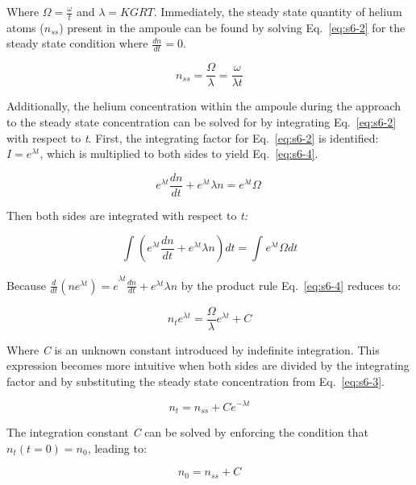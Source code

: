 Where \(\Omega = \frac{\omega}{t}\) and \(\lambda = KGRT\). Immediately,
the steady state quantity of helium atoms (\(n_{ss}\)) present in the
ampoule can be found by solving Eq.~\eqref{eq:s6-2} for the steady state condition
where \(\frac{dn}{dt} = 0\).

\begin{equation}
n_{ss} = \frac{\Omega}{\lambda} = \frac{\omega}{\lambda t}
\label{eq:s6-3}
\end{equation}

Additionally, the helium concentration within the ampoule during the
approach to the steady state concentration can be solved for by
integrating Eq.~\eqref{eq:s6-2} with respect to \emph{t}. First, the integrating
factor for Eq.~\eqref{eq:s6-2} is identified: \(I = e^{\lambda t}\), which is
multiplied to both sides to yield Eq.~\eqref{eq:s6-4}.

\begin{equation}
e^{\lambda t}\frac{dn}{dt} + e^{\lambda t}\lambda n = e^{\lambda t}\Omega\
\label{eq:s6-4}
\end{equation}

Then both sides are integrated with respect to \emph{t:}

\[\int_{}^{}\left( e^{\lambda t}\frac{dn}{dt} + e^{\lambda t}\lambda n \right)dt = \int_{}^{}{e^{\lambda t}\Omega}dt\]

Because
\({\frac{d}{dt}(ne^{\lambda t}) = e}^{\lambda t}\frac{dn}{dt} + e^{\lambda t}\lambda n\)
by the product rule Eq.~\eqref{eq:s6-4} reduces to:

\begin{equation}
n_{t}e^{\lambda t} = \frac{\Omega}{\lambda}e^{\lambda t} + C
\label{eq:s6-5}
\end{equation}

Where \emph{C} is an unknown constant introduced by indefinite
integration. This expression becomes more intuitive when both sides are
divided by the integrating factor and by substituting the steady state
concentration from Eq.~\eqref{eq:s6-3}.

\begin{equation}
n_{t} = n_{ss} + Ce^{- \lambda t}
\label{eq:s6-6}
\end{equation}

The integration constant \emph{C} can be solved by enforcing the
condition that \(n_{t}(t = 0) = n_{0}\), leading to:

\begin{equation}
n_{0} = n_{ss} + C
\label{eq:s6-7}
\end{equation}

